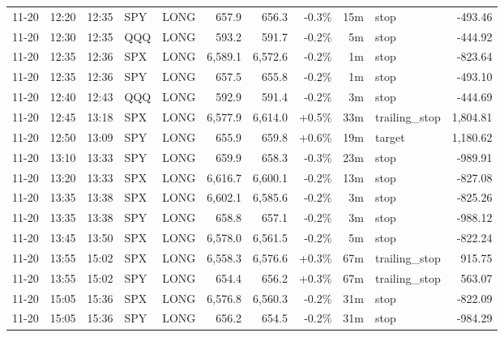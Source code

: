 \documentclass[11pt,a4paper,twoside]{article}
\begin{document}
\begin{center}
\begin{longtable}{>{\color{txtmain}}l l l l l r r r r >{\color{txtmain}}l r}
11-20 & 12:20 & 12:35 & SPY & LONG & 657.9 & 656.3 & \textcolor{lossred}{-0.3\%} & 15m & stop & \textcolor{lossred}{-493.46} \\
11-20 & 12:30 & 12:35 & QQQ & LONG & 593.2 & 591.7 & \textcolor{lossred}{-0.2\%} & 5m & stop & \textcolor{lossred}{-444.92} \\
11-20 & 12:35 & 12:36 & SPX & LONG & 6,589.1 & 6,572.6 & \textcolor{lossred}{-0.2\%} & 1m & stop & \textcolor{lossred}{-823.64} \\
11-20 & 12:35 & 12:36 & SPY & LONG & 657.5 & 655.8 & \textcolor{lossred}{-0.2\%} & 1m & stop & \textcolor{lossred}{-493.10} \\
11-20 & 12:40 & 12:43 & QQQ & LONG & 592.9 & 591.4 & \textcolor{lossred}{-0.2\%} & 3m & stop & \textcolor{lossred}{-444.69} \\
11-20 & 12:45 & 13:18 & SPX & LONG & 6,577.9 & 6,614.0 & \textcolor{wingreen}{+0.5\%} & 33m & trailing\_stop & \textcolor{wingreen}{1,804.81} \\
11-20 & 12:50 & 13:09 & SPY & LONG & 655.9 & 659.8 & \textcolor{wingreen}{+0.6\%} & 19m & target & \textcolor{wingreen}{1,180.62} \\
11-20 & 13:10 & 13:33 & SPY & LONG & 659.9 & 658.3 & \textcolor{lossred}{-0.3\%} & 23m & stop & \textcolor{lossred}{-989.91} \\
11-20 & 13:20 & 13:33 & SPX & LONG & 6,616.7 & 6,600.1 & \textcolor{lossred}{-0.2\%} & 13m & stop & \textcolor{lossred}{-827.08} \\
11-20 & 13:35 & 13:38 & SPX & LONG & 6,602.1 & 6,585.6 & \textcolor{lossred}{-0.2\%} & 3m & stop & \textcolor{lossred}{-825.26} \\
11-20 & 13:35 & 13:38 & SPY & LONG & 658.8 & 657.1 & \textcolor{lossred}{-0.2\%} & 3m & stop & \textcolor{lossred}{-988.12} \\
11-20 & 13:45 & 13:50 & SPX & LONG & 6,578.0 & 6,561.5 & \textcolor{lossred}{-0.2\%} & 5m & stop & \textcolor{lossred}{-822.24} \\
11-20 & 13:55 & 15:02 & SPX & LONG & 6,558.3 & 6,576.6 & \textcolor{wingreen}{+0.3\%} & 67m & trailing\_stop & \textcolor{wingreen}{915.75} \\
11-20 & 13:55 & 15:02 & SPY & LONG & 654.4 & 656.2 & \textcolor{wingreen}{+0.3\%} & 67m & trailing\_stop & \textcolor{wingreen}{563.07} \\
11-20 & 15:05 & 15:36 & SPX & LONG & 6,576.8 & 6,560.3 & \textcolor{lossred}{-0.2\%} & 31m & stop & \textcolor{lossred}{-822.09} \\
11-20 & 15:05 & 15:36 & SPY & LONG & 656.2 & 654.5 & \textcolor{lossred}{-0.2\%} & 31m & stop & \textcolor{lossred}{-984.29} \\

\end{longtable}
\end{center}
\end{document}
